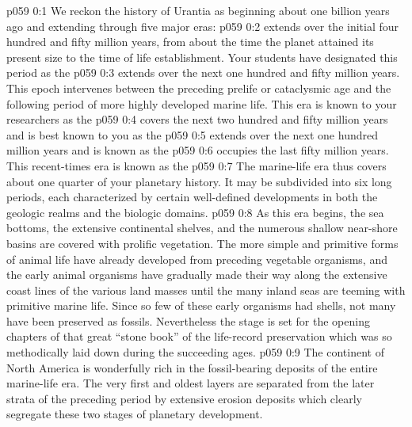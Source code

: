 \author{Life Carrier}
\vs p059 0:1 We reckon the history of Urantia as beginning about one billion years ago and extending through five major eras:
\pc \vs p059 0:2 \bibnobreakspace {} extends over the initial four hundred and fifty million years, from about the time the planet attained its present size to the time of life establishment. Your students have designated this period as the 
\pc \vs p059 0:3 \bibnobreakspace {} extends over the next one hundred and fifty million years. This epoch intervenes between the preceding prelife or cataclysmic age and the following period of more highly developed marine life. This era is known to your researchers as the 
\pc \vs p059 0:4 \bibnobreakspace {} covers the next two hundred and fifty million years and is best known to you as the 
\pc \vs p059 0:5 \bibnobreakspace {} extends over the next one hundred million years and is known as the 
\pc \vs p059 0:6 \bibnobreakspace {} occupies the last fifty million years. This recent\hyp{}times era is known as the 
\pc \vs p059 0:7 The marine\hyp{}life era thus covers about one quarter of your planetary history. It may be subdivided into six long periods, each characterized by certain well\hyp{}defined developments in both the geologic realms and the biologic domains.
\vs p059 0:8 As this era begins, the sea bottoms, the extensive continental shelves, and the numerous shallow near\hyp{}shore basins are covered with prolific vegetation. The more simple and primitive forms of animal life have already developed from preceding vegetable organisms, and the early animal organisms have gradually made their way along the extensive coast lines of the various land masses until the many inland seas are teeming with primitive marine life. Since so few of these early organisms had shells, not many have been preserved as fossils. Nevertheless the stage is set for the opening chapters of that great “stone book” of the life\hyp{}record preservation which was so methodically laid down during the succeeding ages.
\vs p059 0:9 The continent of North America is wonderfully rich in the fossil\hyp{}bearing deposits of the entire marine\hyp{}life era. The very first and oldest layers are separated from the later strata of the preceding period by extensive erosion deposits which clearly segregate these two stages of planetary development.
